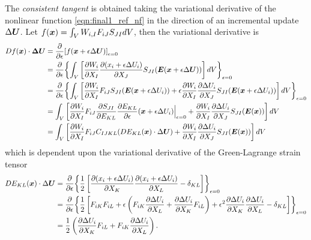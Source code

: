 The \emph{consistent tangent} is obtained taking the variational derivative of the nonlinear function \cref{eqn:final1_ref_nf} in the direction of an incremental update $\Delta \bm{U}$.
Let $f(\bm{x}) = \int_V W_{i,I} F_{iJ} S_{JI} dV$, then the variational derivative is 
\begin{equation}
\begin{aligned}
    Df(\bm{x}) \cdot \bm{\Delta \bm{U}} &= \frac{\partial}{\partial \epsilon} {\left[f(\bm{x} + \epsilon \Delta \bm{U})\right]}_{\epsilon = 0} \\
    &= \frac{\partial}{\partial \epsilon} {\left\{ \int_V \left[ \frac{\partial W_i}{\partial X_I} \frac{\partial (x_i + \epsilon \Delta U_i)}{\partial X_J} S_{JI}(\bm{E}(\bm{x} + \epsilon \Delta \bm{U})) \right] dV\right\}}_{\epsilon = 0} \\
    &= \frac{\partial}{\partial \epsilon} {\left\{ \int_V \left[ \frac{\partial W_i}{\partial X_I} F_{iJ} S_{JI}(\bm{E}(\bm{x} + \epsilon \Delta U_i)) + \epsilon \frac{\partial W_i}{\partial X_I} \frac{\partial \Delta U_i}{\partial X_J} S_{JI}(\bm{E}(\bm{x} + \epsilon \Delta U_i)) \right] dV\right\}}_{\epsilon = 0} \\
    &=  \int_V \left[ \frac{\partial W_i}{\partial X_I} F_{iJ} \frac{\partial S_{JI}}{\partial E_{KL}} \frac{\partial E_{KL}}{\partial \epsilon}(\bm{x} + \epsilon \Delta U_i)\Big|_{\epsilon=0} + \frac{\partial W_i}{\partial X_I} \frac{\partial \Delta U_i}{\partial X_J} S_{JI}(\bm{E}(\bm{x}))\right] dV\\ 
    &= \int_V \left[ \frac{\partial W_i}{\partial X_I} F_{iJ} C_{IJKL} (DE_{KL}(\bm{x}) \cdot \Delta\bm{U}) + \frac{\partial W_i}{\partial X_I} \frac{\partial \Delta U_i}{\partial X_J} S_{JI}(\bm{E}(\bm{x}))\right] dV
\end{aligned}
\end{equation}
which is dependent upon the variational derivative of the Green-Lagrange strain tensor 
\begin{equation}\label{eqn:final1_vderiv_E}
\begin{aligned}
    DE_{KL}(\bm{x}) \cdot \Delta\bm{U} &= \frac{\partial }{\partial \epsilon} {\left\{ \frac{1}{2}\left[\frac{\partial (x_i + \epsilon \Delta U_i)}{\partial X_K} \frac{\partial (x_i + \epsilon \Delta U_i)}{\partial X_L} - \delta_{KL}\right] \right\}}_{\epsilon=0} \\
    &= \frac{\partial }{\partial \epsilon} {\left\{ 
        \frac{1}{2}\left[F_{iK}F_{iL} 
        + \epsilon \left( F_{iK} \frac{\partial \Delta U_i}{\partial X_L} + \frac{\partial \Delta U_i}{\partial X_K} F_{iL} \right) 
        + \epsilon^2 \frac{\partial \Delta U_i}{\partial X_K} \frac{\partial \Delta U_i}{\partial X_L}
        - \delta_{KL}
        \right] \right\}}_{\epsilon=0} \\
    &= \frac{1}{2}\left(\frac{\partial \Delta U_i}{\partial X_K} F_{iL} + F_{iK} \frac{\partial \Delta U_i}{\partial X_L}\right).
\end{aligned}
\end{equation}
